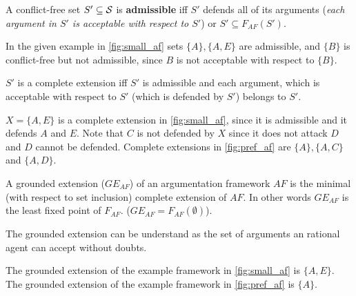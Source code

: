 \begin{definition}
	A conflict-free set $S' \subseteq \S$ is \textbf{admissible} iff $S'$ defends all of its arguments (\textit{each argument in $S'$ is acceptable with respect to $S'$}) or $S' \subseteq F_{AF}(S')$.
\end{definition}

\begin{exa}
In the given example in \autoref{fig:small_af} sets $\{A\}, \{A, E\}$ are admissible, and $\{B\}$ is conflict-free but not admissible, since $B$ is not acceptable with respect to $\{B\}$.
\end{exa}

\begin{definition}
$S'$ is a complete extension iff  $S'$ is admissible and each argument, which is acceptable with respect to $S'$ (which is defended by $S'$) belongs to $S'$.
\end{definition}

\begin{exa}
$X = \{A, E\}$ is a complete extension in \autoref{fig:small_af}, since it is admissible and it defends $A$ and $E$. Note that $C$ is not defended by $X$ since it does not attack $D$ and $D$ cannot be defended.
Complete extensions in \autoref{fig:pref_af} are $\{A\}, \{A, C\}$ and $\{A, D\}$.
\end{exa}


\begin{definition}
A grounded extension ($GE_{AF}$) of an argumentation framework $AF$ is the minimal (with respect to set inclusion) complete extension of $AF$. In other words $GE_{AF}$ is the least fixed point of $F_{AF}$. ($GE_{AF} = F_{AF}(\emptyset)$).
\end{definition}

\begin{remark}
	The grounded extension can be understand as the set of arguments an rational agent can accept without doubts. 
\end{remark}

\begin{exa}
	The grounded extension of the example framework in \autoref{fig:small_af} is $\{A, E\}$.
	The grounded extension of the example framework in \autoref{fig:pref_af} is $\{A\}$.
\end{exa}


